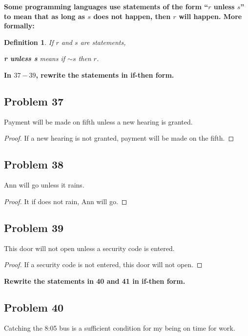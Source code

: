 \documentclass[14pt]{extarticle}
\newtheorem{defn}{Definition}
\begin{document}
{\bf Some programming languages use statements of the form
“$r$ unless $s$” to mean that as long as $s$ does not happen,
then $r$ will happen. More formally:}

\begin{tcolorbox}[colframe=cyan,colback=white]
\begin{defn}
If $r$ and $s$ are statements,
\begin{center}
{\bf r unless s} means if ${\sim s}$ then $r$.
\end{center}
\end{defn}
\end{tcolorbox}

{\bf In $37-39$, rewrite the statements in if-then form.}

\subsection{Problem 37}
Payment will be made on fifth unless a new hearing is granted.

\begin{proof}
If a new hearing is not granted, payment will be made on the fifth.
\end{proof}

\subsection{Problem 38}
Ann will go unless it rains.

\begin{proof}
It if does not rain, Ann will go.
\end{proof}

\subsection{Problem 39}
This door will not open unless a security code is entered.

\begin{proof}
If a security code is not entered, this door will not open.
\end{proof}

{\bf Rewrite the statements in 40 and 41 in if-then form.}

\subsection{Problem 40}
Catching the 8:05 bus is a sufficient condition for my being on time for work.
\end{document}
